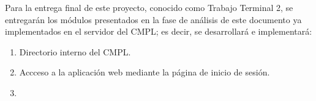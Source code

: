 Para la entrega final de este proyecto, conocido como Trabajo Terminal 2, se entregarán los módulos presentados en la fase de análisis de este documento ya implementados en el servidor del CMPL; es decir, se desarrollará e implementará:

\begin{enumerate}
	\item Directorio interno del CMPL.
	\item Accceso a la aplicación web mediante la página de inicio de sesión.
	\item 
\end{enumerate}